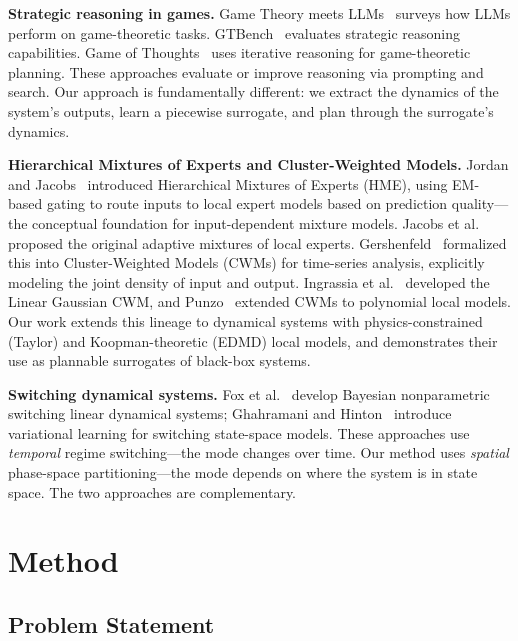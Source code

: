 \documentclass[11pt]{article}
\theoremstyle{definition}
\begin{document}
\textbf{Strategic reasoning in games.} Game Theory meets LLMs~\cite{gtllm2025} surveys how LLMs perform on game-theoretic tasks. GTBench~\cite{gtbench2024} evaluates strategic reasoning capabilities. Game of Thoughts~\cite{gameofthoughts2025} uses iterative reasoning for game-theoretic planning. These approaches evaluate or improve reasoning via prompting and search. Our approach is fundamentally different: we extract the dynamics of the system's outputs, learn a piecewise surrogate, and plan through the surrogate's dynamics.

\textbf{Hierarchical Mixtures of Experts and Cluster-Weighted Models.} Jordan and Jacobs~\cite{jordan1994hme} introduced Hierarchical Mixtures of Experts (HME), using EM-based gating to route inputs to local expert models based on prediction quality---the conceptual foundation for input-dependent mixture models. Jacobs et al.~\cite{jacobs1991adaptive} proposed the original adaptive mixtures of local experts. Gershenfeld~\cite{gershenfeld1997,gershenfeld1999nature} formalized this into Cluster-Weighted Models (CWMs) for time-series analysis, explicitly modeling the joint density of input and output. Ingrassia et al.~\cite{ingrassia2012,ingrassia2014} developed the Linear Gaussian CWM, and Punzo~\cite{punzo2014poly} extended CWMs to polynomial local models. Our work extends this lineage to dynamical systems with physics-constrained (Taylor) and Koopman-theoretic (EDMD) local models, and demonstrates their use as plannable surrogates of black-box systems.

\textbf{Switching dynamical systems.} Fox et al.~\cite{fox2011bayesian} develop Bayesian nonparametric switching linear dynamical systems; Ghahramani and Hinton~\cite{ghahramani2000variational} introduce variational learning for switching state-space models. These approaches use \emph{temporal} regime switching---the mode changes over time. Our method uses \emph{spatial} phase-space partitioning---the mode depends on where the system is in state space. The two approaches are complementary.

\section{Method}\label{sec:method}

\subsection{Problem Statement}
\end{document}
